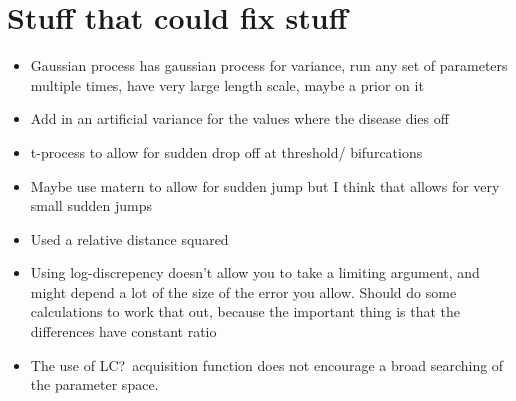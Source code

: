 \chapter{Stuff that could fix stuff}

\begin{itemize}
    \item Gaussian process has gaussian process for variance, run any set of parameters multiple times, have very large length scale, maybe a prior on it
    \item Add in an artificial variance for the values where the disease dies off
    \item t-process to allow for sudden drop off at threshold/ bifurcations
    \item Maybe use matern to allow for sudden jump but I think that allows for very small sudden jumps
    \item Used a relative distance squared
    \item Using log-discrepency doesn't allow you to take a limiting argument, and might depend a lot of the size of the error you allow. Should do some calculations to work that out, because the important thing is that the differences have constant ratio
    \item The use of LC?\ acquisition function does not encourage a broad searching of the parameter space.
\end{itemize}